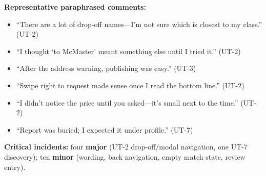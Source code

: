 \textbf{Representative paraphrased comments:}
\begin{itemize}
  \item ``There are a lot of drop-off names---I'm not sure which is closest to my class.'' (UT-2)
  \item ``I thought `to McMaster' meant something else until I tried it.'' (UT-2)
  \item ``After the address warning, publishing was easy.'' (UT-3)
  \item ``Swipe right to request made sense once I read the bottom line.'' (UT-2)
  \item ``I didn't notice the price until you asked---it's small next to the time.'' (UT-2)
  \item ``Report was buried; I expected it under profile.'' (UT-7)
\end{itemize}

\textbf{Critical incidents:} four \textbf{major} (UT-2 drop-off/modal navigation, one UT-7 discovery); ten \textbf{minor} (wording, back navigation, empty match state, review entry).
